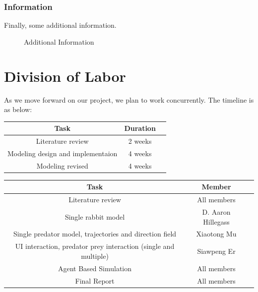 \documentclass{article}
\begin{document}
\begin{normalsize}
\subsubsection{Information}
Finally, some additional information.
\begin{figure}[H]
	\caption{Additional Information}
\end{figure}


		\section{Division of Labor}
		As we move forward on our project, we plan to work concurrently. The timeline is as below:
		
		\begin{center}
			\begin{tabular}{ |c|c|c| } 
				\hline
				Task & Duration  \\ 
				\hline
				Literature review & 2 weeks \\ 
				Modeling design and implementaion & 4 weeks \\ 
				Modeling revised & 4 weeks \\ 
				\hline
			\end{tabular}
		\end{center}
	
		\begin{center}
			\begin{tabular}{ |c|c|c| } 
				\hline
				Task & Member  \\ 
				\hline
				Literature review & All members\\			
				Single rabbit model & D. Aaron Hillegass\\ 
				Single predator model, trajectories and direction field & Xiaotong Mu\\
				UI interaction, predator prey interaction (single and multiple) & Siawpeng Er\\
				Agent Based Simulation & All members\\
				Final Report & All members \\
				\hline
			\end{tabular}
		\end{center}

		
		
		
	\end{normalsize}
	
\end{document}
